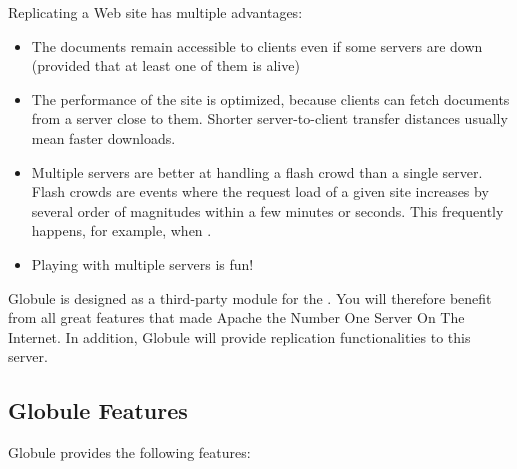 \documentclass[10pt,a4paper]{article}
\makeatletter
\newenvironment{p}{\@open{P}{}}{\@close{P}}
\newenvironment{p}{}{\par}
\makeatother
\begin{document}
\begin{p}
Replicating a Web site has multiple advantages:
\end{p}

\begin{itemize}
\item The documents remain accessible to clients even if some servers
  are down (provided that at least one of them is alive)
\item The performance of the site is optimized, because clients can
  fetch documents from a server close to them. Shorter
  server-to-client transfer distances usually mean faster downloads.
\item Multiple servers are better at handling a flash crowd than a
  single server. Flash crowds are events where the request load of a
  given site increases by several order of magnitudes within a few
  minutes or seconds. This frequently happens, for example, when
  .
\item Playing with multiple servers is fun!
\end{itemize}

\begin{p}
  Globule is designed as a third-party module for the
  .
  You will therefore benefit from all great
  features that made Apache the Number One Server On The Internet. In
  addition, Globule will provide replication functionalities to this
  server.
\end{p}


\subsection{Globule Features}

\begin{p}
  Globule provides the following features:
\end{p}
\end{document}
